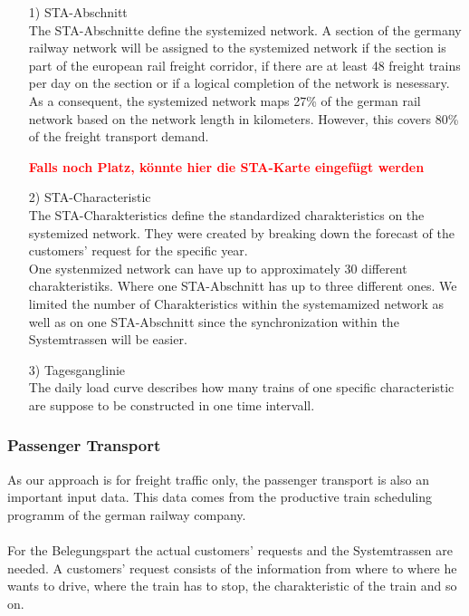 \begin{itemize}
	\item[1)] STA-Abschnitt \\
	The STA-Abschnitte define the systemized network. A section of the germany railway network will be assigned to the systemized network if the section is part of the european rail freight corridor, if there are at least 48 freight trains per day on the section or if a logical completion of the network is nesessary. \\
	As a consequent, the systemized network maps 27\% of the german rail network based on the network length in kilometers. However, this covers 80\% of the freight transport demand. 
	
	\textbf{\textcolor{red}{Falls noch Platz, könnte hier die STA-Karte eingefügt werden}}
	
	\item[2)] STA-Characteristic \\
	The STA-Charakteristics define the standardized charakteristics on the systemized network. They were created by breaking down the forecast of the customers' request for the specific year. \\
	One systenmized network can have up to approximately 30 different charakteristiks. Where one STA-Abschnitt has up to three different ones. We limited the number of Charakteristics within the systemamized network as well as on one STA-Abschnitt since the synchronization within the Systemtrassen will be easier. 
	
	\item[3)] Tagesganglinie \\
	The daily load curve describes how many trains of one specific characteristic are suppose to be constructed in one time intervall. 
\end{itemize}

\subsubsection{Passenger Transport}
As our approach is for freight traffic only, the passenger transport is also an important input data. This data comes from the productive train scheduling programm of the german railway company. \\ 
\\
For the Belegungspart the actual customers' requests and the Systemtrassen are needed. A customers' request consists of the information from where to where he wants to drive, where the train has to stop, the charakteristic of the train and so on.\\

